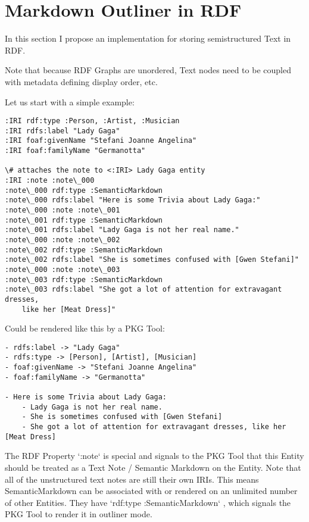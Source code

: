 \section{Markdown Outliner in RDF}

In this section I propose an implementation for storing semistructured Text in RDF.

Note that because RDF Graphs are unordered, Text nodes need to be coupled with metadata defining display order, etc.

Let us start with a simple example:

\begin{lstlisting}
:IRI rdf:type :Person, :Artist, :Musician
:IRI rdfs:label "Lady Gaga"
:IRI foaf:givenName "Stefani Joanne Angelina"
:IRI foaf:familyName "Germanotta"

\# attaches the note to <:IRI> Lady Gaga entity
:IRI :note :note\_000                
:note\_000 rdf:type :SemanticMarkdown
:note\_000 rdfs:label "Here is some Trivia about Lady Gaga:"
:note\_000 :note :note\_001
:note\_001 rdf:type :SemanticMarkdown
:note\_001 rdfs:label "Lady Gaga is not her real name."
:note\_000 :note :note\_002
:note\_002 rdf:type :SemanticMarkdown
:note\_002 rdfs:label "She is sometimes confused with [Gwen Stefani]"
:note\_000 :note :note\_003
:note\_003 rdf:type :SemanticMarkdown
:note\_003 rdfs:label "She got a lot of attention for extravagant dresses, 
    like her [Meat Dress]"
\end{lstlisting}


Could be rendered like this by a PKG Tool:

\begin{lstlisting}
- rdfs:label -> "Lady Gaga"
- rdfs:type -> [Person], [Artist], [Musician]
- foaf:givenName -> "Stefani Joanne Angelina"
- foaf:familyName -> "Germanotta"

- Here is some Trivia about Lady Gaga:
    - Lady Gaga is not her real name.
    - She is sometimes confused with [Gwen Stefani]
    - She got a lot of attention for extravagant dresses, like her [Meat Dress]
\end{lstlisting}


The RDF Property `:note` is special and signals to the PKG Tool that this Entity should be treated as a Text Note / Semantic Markdown on the Entity. Note that all of the unstructured text notes are still their own IRIs. This means SemanticMarkdown can be associated with or rendered on an unlimited number of other Entities. They have `rdf:type :SemanticMarkdown` , which signals the PKG Tool to render it in outliner mode.

